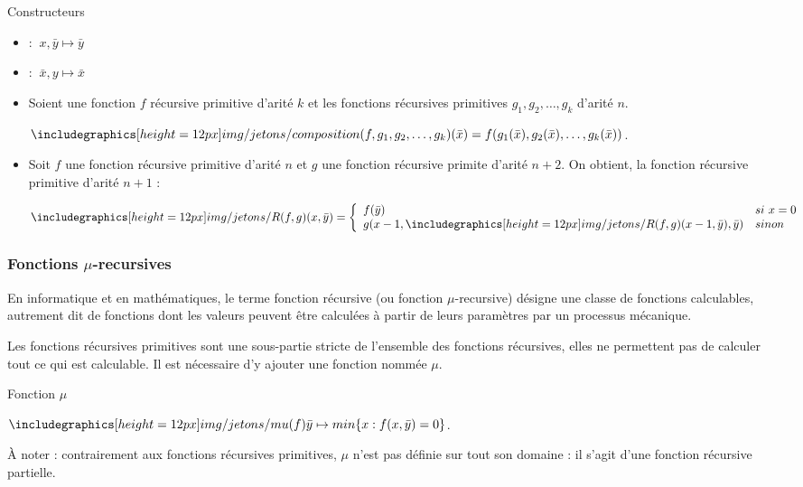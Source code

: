 \begin{definition}{Constructeurs}
\begin{itemize}
\item \Left : $~x, \bar{y} \mapsto \bar{y}$
\item \Right : $~\bar{x}, y \mapsto \bar{x}$
\item Soient une fonction $f$ récursive primitive d'arité $k$ et les fonctions récursives primitives $g_1,g_2,\ldots,g_k$ d'arité $n$. \par $\Composition(f,g_1,g_2,\ldots,g_k)(\bar{x}) = f(g_1(\bar{x}),g_2(\bar{x}),\ldots,g_k(\bar{x}))$.
\item Soit $f$ une fonction récursive primitive d'arité $n$ et $g$ une fonction récursive primite d'arité $n+2$. On obtient, la fonction récursive primitive d'arité $n+1$ :
\par $\Recurse(f,g)(x, \bar{y}) = \left\{
	\begin{array}{ll}
		f(\bar{y}) & si ~x = 0 \\
		g(x-1,\Recurse(f,g)(x-1, \bar{y}),\bar{y}) & sinon
	\end{array} \right.
	$
\end{itemize}
\end{definition}

	\subsubsection{Fonctions $\mu$-recursives}
	
\begin{definition}
En informatique et en mathématiques, le terme fonction récursive (ou fonction $\mu$-recursive) désigne une classe de fonctions calculables, autrement dit de fonctions dont les valeurs peuvent être calculées à partir de leurs paramètres par un processus mécanique.
\par Les fonctions récursives primitives sont une sous-partie stricte de l'ensemble des fonctions récursives, elles ne permettent pas de calculer tout ce qui est calculable. Il est nécessaire d'y ajouter une fonction nommée $\mu$.
\end{definition}

\begin{definition}{Fonction $\mu$}
\par $\Mu(f) \bar{y} \mapsto min\{x : f(x,\bar{y}) = 0\}$.
\par À noter : contrairement aux fonctions récursives primitives, $\mu$ n'est pas définie sur tout son domaine : il s'agit d'une fonction récursive partielle.
\end{definition}

